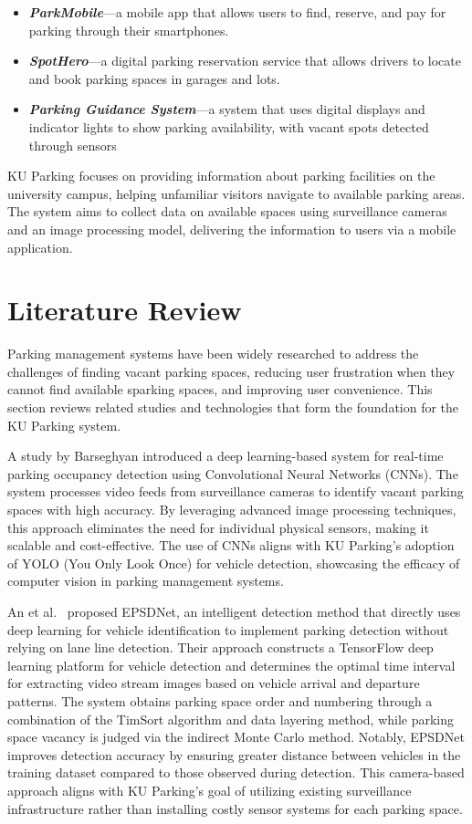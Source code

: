 \begin{itemize}
    \item \textbf{\textit{ParkMobile}}---a mobile app that allows users to find, reserve, and pay for parking through their smartphones.
    \item \textbf{\textit{SpotHero}}---a digital parking reservation service that allows drivers to locate and book parking spaces in garages and lots.
    \item \textbf{\textit{Parking Guidance System}}---a system that uses digital displays and indicator lights to show parking availability, with vacant spots detected through sensors
\end{itemize}
KU Parking focuses on providing information about parking facilities on the university campus, helping unfamiliar visitors navigate to available parking areas. The system aims to collect data on available spaces using surveillance cameras and an image processing model, delivering the information to users via a mobile application.

\section{Literature Review}
\label{section:literature-review}

Parking management systems have been widely researched to address the challenges of finding vacant parking spaces, 
reducing user frustration when they cannot find available sparking spaces, and improving user convenience. 
This section reviews related studies and technologies that form the foundation for the KU Parking system.

A study by Barseghyan\cite{barseghyan2023parking} introduced a deep learning-based system for real-time parking occupancy detection using Convolutional Neural Networks (CNNs). 
The system processes video feeds from surveillance cameras to identify vacant parking spaces with high accuracy. 
By leveraging advanced image processing techniques, this approach eliminates the need for individual physical sensors, making it scalable and cost-effective. 
The use of CNNs aligns with KU Parking's adoption of YOLO (You Only Look Once) for vehicle detection, showcasing the efficacy of computer vision in parking management systems.

An et al.~\cite{an2022epsdnet} proposed EPSDNet, an intelligent detection method that directly uses deep learning 
for vehicle identification to implement parking detection without relying on lane line detection.
 Their approach constructs a TensorFlow deep learning platform for vehicle detection and determines the optimal time interval for 
 extracting video stream images based on vehicle arrival and departure patterns. 
 The system obtains parking space order and numbering through a combination of the TimSort algorithm and data layering method, 
 while parking space vacancy is judged via the indirect Monte Carlo method. Notably, 
 EPSDNet improves detection accuracy by ensuring greater distance between vehicles in the training dataset compared to those observed during detection. 
 This camera-based approach aligns with KU Parking's goal of utilizing existing surveillance infrastructure rather than installing costly sensor systems for each parking space.

